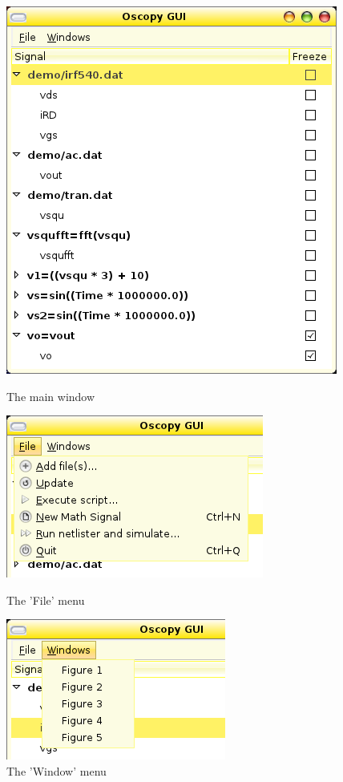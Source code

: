 \documentclass[a4paper,11pt]{report}
\begin{document}
\begin{figure}[htbp]
  \centering
  \includegraphics[scale=.5]{../png/ioscopy-gui.png}
  \caption{The main window}
  \label{fig:mainwin}
  \begin{minipage}{.45\linewidth}
    \includegraphics[scale=.5]{../png/ioscopy-file.png}
    \caption{The 'File' menu}
    \label{fig:filemenu}
  \end{minipage}
  \begin{minipage}{.45\linewidth}
    \includegraphics[scale=.5]{../png/ioscopy-window.png}
    \caption{The 'Window' menu}
    \label{fig:windowmenu}    
  \end{minipage}


\end{figure}
\end{document}
